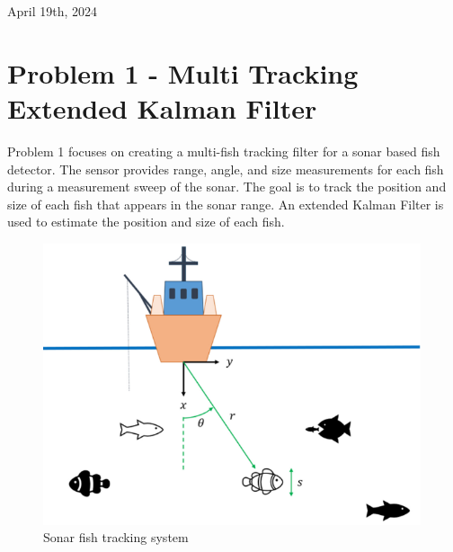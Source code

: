 \documentclass[12pt]{article}
\begin{document}
\vfill
\begin{abstract}
    This report was prepared as the Final Exam deliverable for the Winter 2024 offering of ME 546 - Multi-Sensor Data Fusion at the University of Waterloo. The report covers the design, implementation, and results of three problems: Multi Tracking Kalman Filter, Ball Tracking with Bayesian Fusion, and Neural Network Estimation of Walking Gate Ground Force.
\end{abstract}
{ %
    \centering
    \large
    April 19th, 2024\\ 
}
\clearpage
\fancyfoot[C]{\thepage} %

\clearpage
\tableofcontents
\clearpage

\listoftables %
\listoffigures %
\listofequations %

\clearpage
{} %
\section{Problem 1 - Multi Tracking Extended Kalman Filter}
Problem 1 focuses on creating a multi-fish tracking filter for a sonar based fish detector. The sensor provides range, angle, and size measurements for each fish during a measurement sweep of the sonar. The goal is to track the position and size of each fish that appears in the sonar range. An extended Kalman Filter is used to estimate the position and size of each fish.

\begin{figure}[H]
    \centering
    \includegraphics[width=0.99\textwidth]{Problem 1/assets/Sensor-Context.png}
    \caption{Sonar fish tracking system \cite{final-exam}}
    \label{fig:p1-sonar}
\end{figure}
\end{document}
